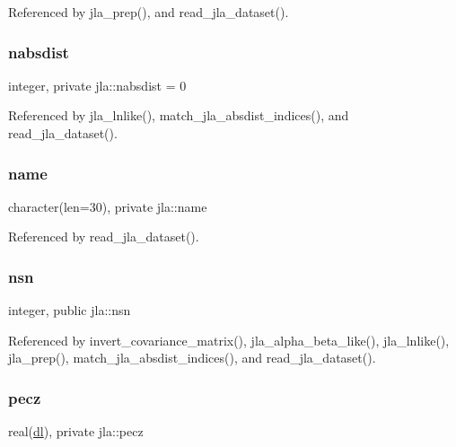 Referenced by jla\+\_\+prep(), and read\+\_\+jla\+\_\+dataset().

\mbox{\label{namespacejla_ac196ce11e9bc46a1f0f7190de071358a}} 
\subsubsection{\texorpdfstring{nabsdist}{nabsdist}}
{\footnotesize\ttfamily integer, private jla\+::nabsdist = 0\hspace{0.3cm}{\ttfamily [private]}}



Referenced by jla\+\_\+lnlike(), match\+\_\+jla\+\_\+absdist\+\_\+indices(), and read\+\_\+jla\+\_\+dataset().

\mbox{\label{namespacejla_a344f6058fc2504417d29ec6990051554}} 
\subsubsection{\texorpdfstring{name}{name}}
{\footnotesize\ttfamily character(len=30), private jla\+::name\hspace{0.3cm}{\ttfamily [private]}}



Referenced by read\+\_\+jla\+\_\+dataset().

\mbox{\label{namespacejla_aff413afd9288880fbc89d3a1f24f60eb}} 
\subsubsection{\texorpdfstring{nsn}{nsn}}
{\footnotesize\ttfamily integer, public jla\+::nsn}



Referenced by invert\+\_\+covariance\+\_\+matrix(), jla\+\_\+alpha\+\_\+beta\+\_\+like(), jla\+\_\+lnlike(), jla\+\_\+prep(), match\+\_\+jla\+\_\+absdist\+\_\+indices(), and read\+\_\+jla\+\_\+dataset().

\mbox{\label{namespacejla_a5f4aaf92cb5a44de1cce93628083b789}} 
\subsubsection{\texorpdfstring{pecz}{pecz}}
{\footnotesize\ttfamily real(\mbox{\hyperlink{namespacejla_a3aa6435b4e08f1d532390186ac608741}{dl}}), private jla\+::pecz\hspace{0.3cm}{\ttfamily [private]}}




